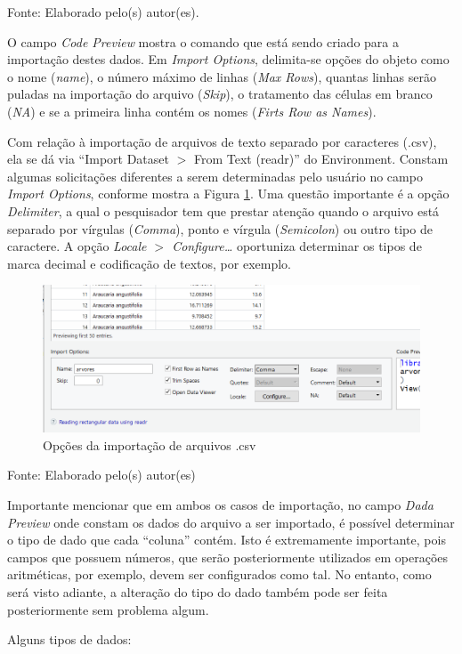 \documentclass[12pt,brazil,oneside]{book}
\begin{document}
Fonte: Elaborado pelo(s) autor(es).

O campo \emph{Code Preview} mostra o comando que está sendo criado para
a importação destes dados. Em \emph{Import Options}, delimita-se opções
do objeto como o nome (\emph{name}), o número máximo de linhas
(\emph{Max Rows}), quantas linhas serão puladas na importação do arquivo
(\emph{Skip}), o tratamento das células em branco (\emph{NA}) e se a
primeira linha contém os nomes (\emph{Firts Row as Names}).

Com relação à importação de arquivos de texto separado por caracteres
(.csv), ela se dá via ``Import Dataset \(>\) From Text (readr)'' do
Environment. Constam algumas solicitações diferentes a serem
determinadas pelo usuário no campo \emph{Import Options}, conforme
mostra a Figura \ref{fig:r4csv}. Uma questão importante é a opção
\emph{Delimiter}, a qual o pesquisador tem que prestar atenção quando o
arquivo está separado por vírgulas (\emph{Comma}), ponto e vírgula
(\emph{Semicolon}) ou outro tipo de caractere. A opção \emph{Locale
\(>\) Configure\ldots{}} oportuniza determinar os tipos de marca decimal
e codificação de textos, por exemplo.

\begin{figure}[H]

{\centering \includegraphics[width=0.6\linewidth]{r4csv} 

}

\caption{Opções da importação de arquivos .csv}\label{fig:r4csv}
\end{figure}

Fonte: Elaborado pelo(s) autor(es)

Importante mencionar que em ambos os casos de importação, no campo
\emph{Dada Preview} onde constam os dados do arquivo a ser importado, é
possível determinar o tipo de dado que cada ``coluna'' contém. Isto é
extremamente importante, pois campos que possuem números, que serão
posteriormente utilizados em operações aritméticas, por exemplo, devem
ser configurados como tal. No entanto, como será visto adiante, a
alteração do tipo do dado também pode ser feita posteriormente sem
problema algum.

Alguns tipos de dados:
\end{document}
